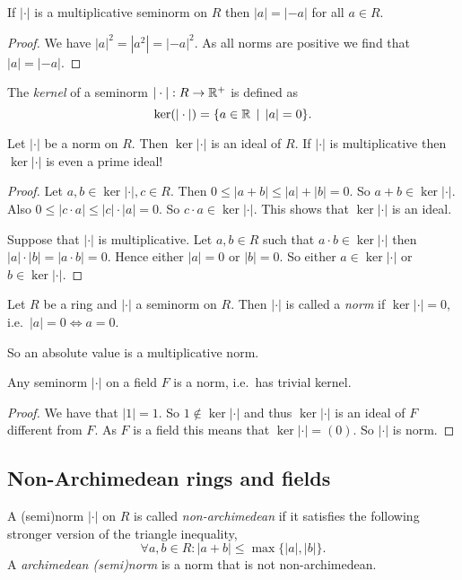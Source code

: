 \begin{lemma}
	If $|\cdot |$ is a multiplicative seminorm on $R$ then  $|a | = |-a|$ for all $a \in R$. 
\end{lemma}
\begin{proof}
	We have $|a|^2 = |a^2| = |-a|^2$. As all norms are positive we find that $|a| = |-a|$. 
\end{proof}


\begin{definition}
	The \emph{kernel} of a seminorm $|\cdot |: R \to \mathbb{R}^{+}$ is defined as \[
		\ker(|\cdot |) = \{a \in \R \st |a| = 0\} 
	.\] 
\end{definition}
\begin{remark}\label{rem:ker_norm_ideal}
	Let $ |\cdot |$ be a norm on $R$. Then $\ker |\cdot |$ is an ideal of $R$. If $|\cdot |$ is multiplicative then $\ker |\cdot |$ is even a prime ideal!
\end{remark}
\begin{proof}
	Let $a, b \in \ker |\cdot |, c \in R$. Then $0 \le |a + b| \le |a|+|b| = 0$. So  $a + b \in \ker |\cdot |$. 
	Also $0 \le |c \cdot a| \le |c|\cdot |a| = 0$. So $c \cdot a \in \ker |\cdot |$. 
	This shows that $\ker |\cdot  |$ is an ideal. 
	
	Suppose that $|\cdot |$ is multiplicative. 
	Let $a, b\in R $ such that $a\cdot b \in \ker |\cdot |$ then  $|a|\cdot |b| = |a\cdot b| = 0$. 
	Hence either $|a| = 0$ or  $|b|=0$. 
	So either  $a \in \ker |\cdot |$ or $b \in \ker |\cdot |$. 
\end{proof}


\begin{definition}
	Let $R$ be a ring and $|\cdot |$ a seminorm on $R$. 
	Then $|\cdot |$ is called a \emph{norm} if $\ker |\cdot | = 0$, i.e.\ $|a| = 0 \iff a = 0$. 
\end{definition}

So an absolute value is a multiplicative norm. 

\begin{lemma}
	Any seminorm $|\cdot |$ on a field $F$ is a norm, i.e.\ has trivial kernel. 
\end{lemma}
\begin{proof}
	We have that $|1| = 1$. So $1 \not\in \ker |\cdot |$ and thus $\ker |\cdot |$ is an ideal of $F$ different from $F$. 
	As $F$ is a field this means that $\ker |\cdot | = (0)$. So $|\cdot |$ is norm. 
\end{proof}

\subsection{Non-Archimedean rings and fields} \label{sec:non-archimedean_rings_and_fields}
\begin{definition}
	A (semi)norm $|\cdot |$ on $R$ is called \emph{non-archimedean} if it satisfies the following stronger version of the triangle inequality, \[
	\forall a, b \in R: |a + b| \le \max \{|a|, |b|\} 
	.\] 
	A \emph{archimedean (semi)norm} is a norm that is not non-archimedean.
\end{definition}

